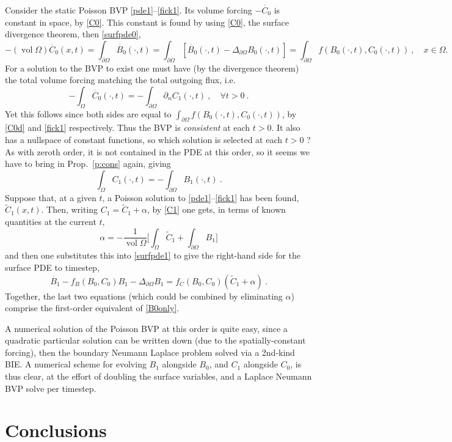 \documentclass[10pt]{article}
\newcommand{\be}{\begin{equation}}
\newcommand{\ee}{\end{equation}}
\newcommand{\bigO}{{\mathcal O}}
\DeclareMathOperator{\vol}{vol}
\newcommand{\pO}{{\partial\Omega}}
\newcommand{\LpO}{\Delta_\pO}
\newcommand{\eps}{\epsilon}
\newcommand{\dn}{\partial_n}
\begin{document}
Consider the static Poisson BVP \eqref{pde1}--\eqref{fick1}.
Its volume forcing $-\dot{C_0}$ is constant in space, by \eqref{C0}.
This constant is found by using \eqref{C0},
the surface divergence theorem, then
\eqref{surfpde0},
\be
-(\vol\Omega)\dot{C_0}(x,t) = \int_\pO \dot{B_0}(\cdot, t) =
\int_\pO [\dot{B_0}(\cdot, t) - \LpO B_0(\cdot,t) ]=
\int_\pO f(B_0(\cdot,t),C_0(\cdot,t))~, \quad x\in\Omega.
\label{C0d}
\ee
For a solution to the BVP to exist one must have (by the divergence theorem)
the total volume forcing matching the total outgoing flux,
i.e.
$$
-\int_\Omega \dot{C_0}(\cdot,t) = -\int_\pO \dn C_1(\cdot,t)~,  \quad \forall t>0~.
$$
Yet this follows since both sides are equal to 
$\int_\pO f(B_0(\cdot,t),C_0(\cdot,t))$, by \eqref{C0d} and 
\eqref{fick1} respectively.
Thus the BVP is {\em consistent} at each $t>0$.
It also has a nullspace of constant functions, so which solution
is selected at each $t>0$ ?
As with zeroth order, it is not contained in the PDE at this order,
so it seems we have to bring in
Prop.~\ref{p:cons} again, giving
\be
\int_\Omega C_1(\cdot,t) = -\int_\pO B_1(\cdot,t)~.
\label{C1}
\ee
Suppose that, at a given $t$,
a Poisson solution to \eqref{pde1}--\eqref{fick1} has been found,
$\tilde{C}_1(x,t)$.
Then, writing $C_1 = \tilde{C}_1 + \alpha$,
by \eqref{C1} one gets, in terms of known quantities at the current $t$,
$$
\alpha = -\frac{1}{\vol\Omega} \biggl[
  \int_\Omega \tilde{C}_1 + \int_\pO B_1
  \biggr]
$$
and then one substitutes this into \eqref{surfpde1} to give
the right-hand side for the surface PDE to timestep,
$$
\dot{B_1} - f_B(B_0,C_0) B_1 - \LpO B_1
=  f_C(B_0,C_0) (\tilde{C}_1 + \alpha)
~.
$$
Together, the last two equations (which could be combined by eliminating $\alpha$)
comprise the first-order equivalent of \eqref{B0only}.

A numerical solution of the Poisson BVP at this order is
quite easy, since a quadratic particular solution can be written down
(due to the spatially-constant forcing), then the boundary Neumann Laplace
problem solved via a 2nd-kind BIE.
A numerical scheme for evolving $B_1$ alongside $B_0$,
and $C_1$ alongside $C_0$, is thus clear,
at the effort of doubling the surface variables, and a Laplace Neumann
BVP solve per timestep.




\section{Conclusions}
\end{document}
